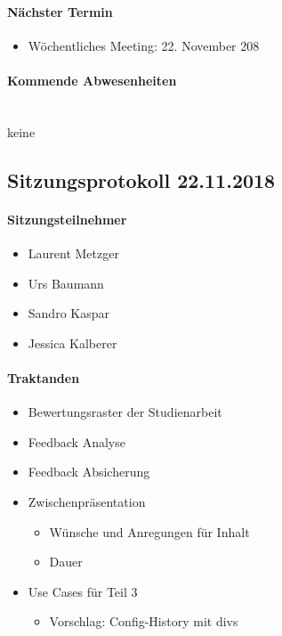 \paragraph{Nächster Termin}
\begin{itemize}	
	\item Wöchentliches Meeting: 22. November 208
\end{itemize}

\paragraph{Kommende Abwesenheiten} \mbox{}\\
keine


\newpage






\subsection{Sitzungsprotokoll 22.11.2018}

\paragraph{Sitzungsteilnehmer}
\begin{itemize}	
	\item Laurent Metzger
	\item Urs Baumann
	\item Sandro Kaspar
	\item Jessica Kalberer
\end{itemize}

\paragraph{Traktanden}
\begin{itemize}	
	\item Bewertungsraster der Studienarbeit
	\item Feedback Analyse
	\item Feedback Absicherung
	\item Zwischenpräsentation 
	\begin{itemize}
		\item Wünsche und Anregungen für Inhalt
		\item Dauer
	\end{itemize}
	\item Use Cases für Teil 3
	\begin{itemize}
		\item Vorschlag: Config-History mit divs
	\end{itemize}
\end{itemize}

